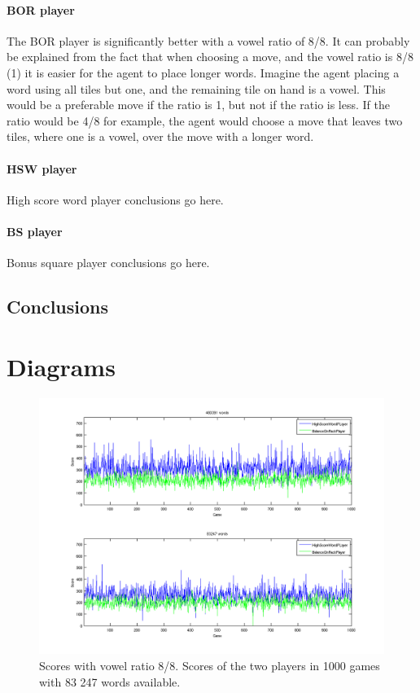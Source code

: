 \documentclass[a4paper, 12pt]{report}
\begin{document}
\subsubsection{BOR player}
The BOR player is significantly better with a vowel ratio of 8/8. It can probably be explained from the fact that when choosing a move, and the vowel ratio is 8/8 (1) it is easier for the agent to place longer words. Imagine the agent placing a word using all tiles but one, and the remaining tile on hand is a vowel. This would be a preferable move if the ratio is 1, but not if the ratio is less. If the ratio would be 4/8 for example, the agent would choose a move that leaves two tiles, where one is a vowel, over the move with a longer word. 

\subsubsection{HSW player}
High score word player conclusions go here.

\subsubsection{BS player}
Bonus square player conclusions go here.

\section{Conclusions}


\appendix
\chapter{Diagrams}

\begin{figure}[h]
\centering
\includegraphics[scale=0.5]{HighBalance8vow_bothDict}
\caption {Scores with vowel ratio 8/8. Scores of the two players in 1000 games with 83 247 words available.}
\label{fig:largeDict}
\end{figure}
\end{document}
